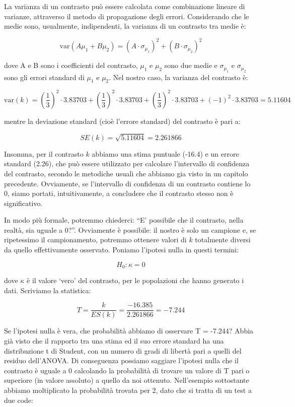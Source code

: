 \documentclass[a4paper,12pt,oneside]{book}
\begin{document}
La varianza di un contrasto può essere calcolata come combinazione lineare di varianze, attraverso il metodo di propagazione degli errori. Considerando che le medie sono, usualmente, indipendenti, la varianza di un contrasto tra medie è:

\[\textrm{var}(A \mu_1 + B \mu_2) = (A \cdot \sigma_{\mu_1} )^{2}  + (B \cdot \sigma_{\mu_2} ) ^ 2\]

dove A e B sono i coefficienti del contrasto, \(\mu_1\) e \(\mu_2\) sono due medie e \(\sigma_{\mu_1}\) e \(\sigma_{\mu_2}\) sono gli errori standard di \(\mu_1\) e \(\mu_2\). Nel nostro caso, la varianza del contrasto è:

\[\textrm{var}(k) = \left( \frac{1}{3} \right)^2 \cdot 3.83703  +  \left( \frac{1}{3}\right)^2 \cdot 3.83703 + \left( \frac{1}{3}  \right)^2 \cdot 3.83703 + \left( - 1 \right)^2 \cdot 3.83703  = 5.11604\]

mentre la deviazione standard (cioè l'errore standard) del contrasto è pari a:

\[ SE(k) = \sqrt{5.11604} = 2.261866\]

Insomma, per il contrasto \(k\) abbiamo una stima puntuale (-16.4) e un errore standard (2.26), che può essere utilizzato per calcolare l'intervallo di confidenza del contrasto, secondo le metodiche usuali che abbiamo gia visto in un capitolo precedente. Ovviamente, se l'intervallo di confidenza di un contrasto contiene lo 0, siamo portati, intuitivamente, a concludere che il contrasto stesso non è significativo.

In modo più formale, potremmo chiederci: ``E' possibile che il contrasto, nella realtà, sia uguale a 0?''. Ovviamente è possibile: il nostro è solo un campione e, se ripetessimo il campionamento, potremmo ottenere valori di \(k\) totalmente diversi da quello effettivamente osservato. Poniamo l'ipotesi nulla in questi termini:

\[H_0: \kappa = 0\]

dove \(\kappa\) è il valore `vero' del contrasto, per le popolazioni che hanno generato i dati. Scriviamo la statistica:

\[T = \frac{k}{ES(k)} = \frac{-16.385}{2.261866} = -7.244\]

Se l'ipotesi nulla è vera, che probabilità abbiamo di osservare T = -7.244? Abbia già visto che il rapporto tra una stima ed il suo errore standard ha una distribuzione t di Student, con un numero di gradi di libertà pari a quelli del residuo dell'ANOVA. Di conseguenza possiamo saggiare l'ipotesi nulla che il contrasto è uguale a 0 calcolando la probabilità di trovare un valore di T pari o superiore (in valore assoluto) a quello da noi ottenuto. Nell'esempio sottostante abbiamo moltiplicato la probabilità trovata per 2, dato che si tratta di un test a due code:
\end{document}
